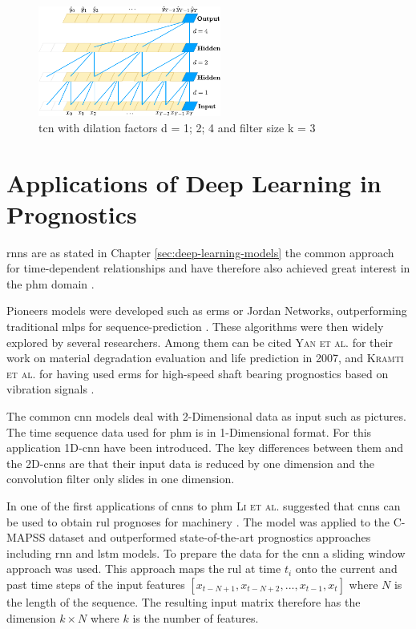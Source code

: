\documentclass[conference]{IEEEtran}
\begin{document}
\begin{figure}[htp]
	\centering
	\includegraphics[width=6cm]{tcn_architecture.pdf}
	\caption{\gls{tcn} with dilation factors d = 1; 2; 4 and filter size k = 3 \cite{Bai2018}}
	\label{fig:tcn-architecture}
\end{figure}

\section{Applications of Deep Learning in Prognostics}
\label{sec:applications-of-deep-learning-in-prognostics}

\glspl{rnn} are as stated in Chapter \ref{sec:deep-learning-models} the common approach for time-dependent relationships and have therefore also achieved great interest in the \gls{phm} domain \cite{Akrim2021}.


Pioneers models were developed such as \glspl{erm} or Jordan Networks, outperforming traditional \glspl{mlp} for sequence-prediction \cite{Akrim2021}. These algorithms were then widely explored by several researchers. Among them can be cited \textsc{Yan et al.} for their work on material degradation evaluation and life prediction in 2007, and \textsc{Kramti et al.} for having used \glspl{erm} for high-speed shaft bearing prognostics based on vibration signals \cite{Akrim2021}.

The common \gls{cnn} models deal with 2-Dimensional data as input such as pictures. The time sequence data used for \gls{phm} is in 1-Dimensional format. For this application 1D-\gls{cnn} have been introduced. The key differences between them and the 2D-\glspl{cnn} are that their input data is reduced by one dimension and the convolution filter only slides in one dimension. \cite{Akrim2021}

In one of the first applications of \glspl{cnn} to \gls{phm} \textsc{Li et al.} suggested that \glspl{cnn} can be used to obtain \gls{rul} prognoses for machinery \cite{Li2018}. The model was applied to the C-MAPSS dataset \cite{Saxena2008} and outperformed state-of-the-art prognostics approaches including \gls{rnn} and \gls{lstm} models. To prepare the data for the \gls{cnn} a sliding window approach was used. This approach maps the \gls{rul} at time $ t_i $ onto the current and past time steps of the input features $ [x_{t-N+1}, x_{t-N+2},..., x_{t-1}, x_t] $ where $ N $ is the length of the sequence. The resulting input matrix therefore has the dimension $ k \times N $ where $ k $ is the number of features.
\end{document}
